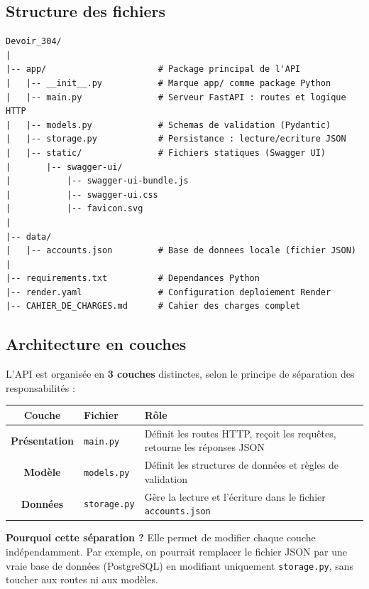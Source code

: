 \documentclass[12pt,a4paper]{article}
\begin{document}
\subsection{Structure des fichiers}

\begin{lstlisting}[style=bash, caption={Arborescence du projet}]
Devoir_304/
|
|-- app/                      # Package principal de l'API
|   |-- __init__.py           # Marque app/ comme package Python
|   |-- main.py               # Serveur FastAPI : routes et logique HTTP
|   |-- models.py             # Schemas de validation (Pydantic)
|   |-- storage.py            # Persistance : lecture/ecriture JSON
|   |-- static/               # Fichiers statiques (Swagger UI)
|       |-- swagger-ui/
|           |-- swagger-ui-bundle.js
|           |-- swagger-ui.css
|           |-- favicon.svg
|
|-- data/
|   |-- accounts.json         # Base de donnees locale (fichier JSON)
|
|-- requirements.txt          # Dependances Python
|-- render.yaml               # Configuration deploiement Render
|-- CAHIER_DE_CHARGES.md      # Cahier des charges complet
\end{lstlisting}

\subsection{Architecture en couches}

L'API est organisée en \textbf{3 couches} distinctes, selon le principe de séparation des responsabilités :

\begin{center}
\begin{tabular}{clp{8cm}}
\toprule
\textbf{Couche} & \textbf{Fichier} & \textbf{Rôle} \\
\midrule
\textbf{Présentation} & \texttt{main.py} & Définit les routes HTTP, reçoit les requêtes, retourne les réponses JSON \\
\textbf{Modèle} & \texttt{models.py} & Définit les structures de données et règles de validation \\
\textbf{Données} & \texttt{storage.py} & Gère la lecture et l'écriture dans le fichier \texttt{accounts.json} \\
\bottomrule
\end{tabular}
\end{center}

\begin{infobox}
\textbf{Pourquoi cette séparation ?} Elle permet de modifier chaque couche indépendamment. Par exemple, on pourrait remplacer le fichier JSON par une vraie base de données (PostgreSQL) en modifiant uniquement \texttt{storage.py}, sans toucher aux routes ni aux modèles.
\end{infobox}
\end{document}
